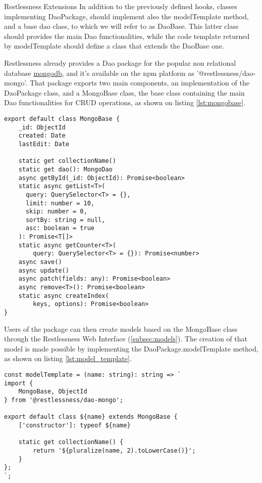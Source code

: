 \begin{chapter}{Restlessness Extensions}
    In addition to the previously defined hooks, classes implementing DaoPackage,
    should implement also the modelTemplate method, and a base dao class, to which
    we will refer to as DaoBase. This latter class should provides the main Dao
    functionalities, while the code template returned by modelTemplate should define
    a class that extends the DaoBase one.

    Restlessness already provides a Dao package for the popular non relational
    database \href{https://www.mongodb.com/}{mongodb}, and it's available on the
    npm platform as '@restlessness/dao-mongo'.
    That package exports two main components, an implementation of the DaoPackage
    class, and a MongoBase class, the base class containing the main Dao
    functionalities for CRUD operations, as shown on listing \ref{lst:mongobase}.

    \begin{lstlisting}[caption=MongoBase class definition, label={lst:mongobase}]
export default class MongoBase {
    _id: ObjectId
    created: Date
    lastEdit: Date

    static get collectionName()
    static get dao(): MongoDao
    async getById(_id: ObjectId): Promise<boolean>
    static async getList<T>(
      query: QuerySelector<T> = {},
      limit: number = 10,
      skip: number = 0,
      sortBy: string = null,
      asc: boolean = true
    ): Promise<T[]>
    static async getCounter<T>(
        query: QuerySelector<T> = {}): Promise<number>
    async save()
    async update()
    async patch(fields: any): Promise<boolean>
    async remove<T>(): Promise<boolean>
    static async createIndex(
        keys, options): Promise<boolean>
}
    \end{lstlisting}

    Users of the package can then create models based on the MongoBase class through
    the Restlessness Web Interface (\ref{subsec:models}).
    The creation of that model is made possible by implementing the DaoPackage.modelTemplate
    method, as shown on listing \ref{lst:model_template}.

    \begin{lstlisting}[caption=modelTemplate function definition, label={lst:model_template}]
const modelTemplate = (name: string): string => `
import {
    MongoBase, ObjectId
} from '@restlessness/dao-mongo';

export default class ${name} extends MongoBase {
    ['constructor']: typeof ${name}

    static get collectionName() {
        return '${pluralize(name, 2).toLowerCase()}';
    }
};
`;
    \end{lstlisting}


\end{chapter}

